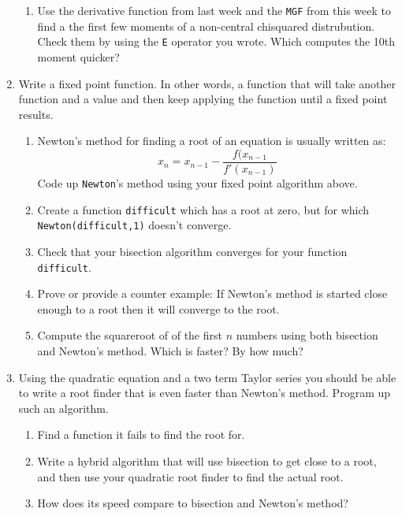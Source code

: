 \begin{enumerate}
\begin{enumerate}
\item Use the derivative function from last week and the {\tt MGF}
from this week to find a the first few moments of a non-central
chisquared distrubution.  Check them by using the {\tt E} operator you
wrote.  Which computes the 10th moment quicker?
\end{enumerate}
\newpage
\item Write a fixed point function.  In other words, a function that
will take another function and a value and then keep applying the
function until a fixed point results.  
\begin{enumerate}
\item Newton's method for finding a root of an equation is usually
written as: 
$$x_n = x_{n-1} - \frac{f(x_{n-1}}{f'(x_{n-1})}$$ 
Code up {\tt Newton}'s method using your fixed point algorithm above.
\item Create a function {\tt difficult} which has a root at zero, but
for which {\tt Newton(difficult,1)} doesn't converge.
\item Check that your bisection algorithm converges for your function
{\tt difficult}.
\item Prove or provide a counter example: If Newton's method is
started close enough to a root then it will converge to the root.
\item Compute the squareroot of of the first $n$ numbers using both
bisection and Newton's method.  Which is faster?  By how much?
\end{enumerate}
\item Using the quadratic equation and a two term Taylor series you
should be able to write a root finder that is even faster than
Newton's method.  Program up such an algorithm.
\begin{enumerate}
\item Find a function it fails to find the root for.
\item Write a hybrid algorithm that will use bisection to get close to
a root, and then use your quadratic root finder to find the actual
root. 
\item  How does its speed compare to bisection and Newton's method?  
\end{enumerate}
\end{enumerate}

